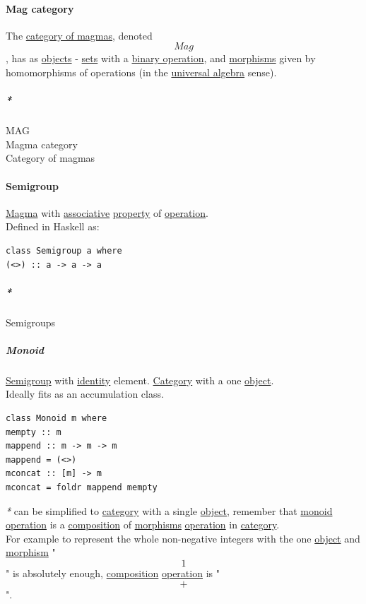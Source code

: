 \documentclass[11pt]{article}
\begin{document}
\paragraph{\label{org1b71473}Mag category}
\label{sec:org0f1eb89}
The \hyperref[org16e7b59]{category of magmas}, denoted $$ Mag $$, has as \hyperref[org363acc2]{objects} - \hyperref[org58ec608]{sets} with a \hyperref[orga030476]{binary operation}, and \hyperref[org6c2fa5c]{morphisms} given by homomorphisms of operations (in the \hyperref[org6d6bfe0]{universal algebra} sense).\\

\subparagraph{\emph{*}}
\label{sec:orgeac9ec8}

\label{orgcbe019d}MAG\\
\label{org5f3602e}Magma category\\
\label{org16e7b59}Category of magmas\\

\paragraph{\label{org543a9ea}Semigroup}
\label{sec:orgb61b63f}
\hyperref[org05fa596]{Magma} with \hyperref[orgbef8a27]{associative} \hyperref[orgf8c3cc7]{property} of \hyperref[org1173fe8]{operation}.\\

Defined in Haskell as:\\
\begin{verbatim}
class Semigroup a where
(<>) :: a -> a -> a
\end{verbatim}

\subparagraph{\emph{*}}
\label{sec:orgef359f8}

\label{orga061230}Semigroups\\

\subparagraph{\label{org37d140b}Monoid}
\label{sec:org76d8030}
\hyperref[org543a9ea]{Semigroup} with \hyperref[org9b95fd5]{identity} element. \hyperref[org0450535]{Category} with a one \hyperref[org4be0e9d]{object}.\\

Ideally fits as an accumulation class.\\

\begin{verbatim}
class Monoid m where
mempty :: m
mappend :: m -> m -> m
mappend = (<>)
mconcat :: [m] -> m
mconcat = foldr mappend mempty
\end{verbatim}

\emph{*} can be simplified to \hyperref[org0450535]{category} with a single \hyperref[org4be0e9d]{object}, remember that \hyperref[org37d140b]{monoid} \hyperref[org1173fe8]{operation} is a \hyperref[orga128e7f]{composition} of \hyperref[org6c2fa5c]{morphisms} \hyperref[org1173fe8]{operation} in \hyperref[org0450535]{category}.\\
For example to represent the whole non-negative integers with the one \hyperref[org4be0e9d]{object} and \hyperref[org5de09d4]{morphism} "$$ 1 $$" is absolutely enough, \hyperref[orga128e7f]{composition} \hyperref[org1173fe8]{operation} is "$$ + $$".\\
\end{document}
